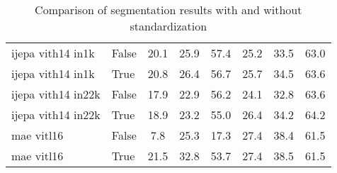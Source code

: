 \begin{table}
\begin{tabular}{llcccccc}
ijepa vith14 in1k & False & {\cellcolor[HTML]{FFF6B0}} \color[HTML]{000000} 20.1 & {\cellcolor[HTML]{E75337}} \color[HTML]{F1F1F1} 25.9 & {\cellcolor[HTML]{48AE5C}} \color[HTML]{F1F1F1} 57.4 & {\cellcolor[HTML]{E5F49B}} \color[HTML]{000000} 25.2 & {\cellcolor[HTML]{FBA35C}} \color[HTML]{000000} 33.5 & {\cellcolor[HTML]{E44C34}} \color[HTML]{F1F1F1} 63.0 \\
ijepa vith14 in1k & True & {\cellcolor[HTML]{FFFEBE}} \color[HTML]{000000} 20.8 & {\cellcolor[HTML]{EF633F}} \color[HTML]{F1F1F1} 26.4 & {\cellcolor[HTML]{54B45F}} \color[HTML]{F1F1F1} 56.7 & {\cellcolor[HTML]{DFF293}} \color[HTML]{000000} 25.7 & {\cellcolor[HTML]{FDC171}} \color[HTML]{000000} 34.5 & {\cellcolor[HTML]{F26841}} \color[HTML]{F1F1F1} 63.6 \\
ijepa vith14 in22k & False & {\cellcolor[HTML]{FED884}} \color[HTML]{000000} 17.9 & {\cellcolor[HTML]{A50026}} \color[HTML]{F1F1F1} 22.9 & {\cellcolor[HTML]{5DB961}} \color[HTML]{F1F1F1} 56.2 & {\cellcolor[HTML]{F2FAAE}} \color[HTML]{000000} 24.1 & {\cellcolor[HTML]{F88950}} \color[HTML]{F1F1F1} 32.8 & {\cellcolor[HTML]{F26841}} \color[HTML]{F1F1F1} 63.6 \\
ijepa vith14 in22k & True & {\cellcolor[HTML]{FEE999}} \color[HTML]{000000} 18.9 & {\cellcolor[HTML]{AD0826}} \color[HTML]{F1F1F1} 23.2 & {\cellcolor[HTML]{6EC064}} \color[HTML]{000000} 55.0 & {\cellcolor[HTML]{D7EE8A}} \color[HTML]{000000} 26.4 & {\cellcolor[HTML]{FDB768}} \color[HTML]{000000} 34.2 & {\cellcolor[HTML]{F88950}} \color[HTML]{F1F1F1} 64.2 \\
mae vitl16 & False & {\cellcolor[HTML]{A50026}} \color[HTML]{F1F1F1} 7.8 & {\cellcolor[HTML]{DE402E}} \color[HTML]{F1F1F1} 25.3 & {\cellcolor[HTML]{A50026}} \color[HTML]{F1F1F1} 17.3 & {\cellcolor[HTML]{C7E77F}} \color[HTML]{000000} 27.4 & {\cellcolor[HTML]{EEF8A8}} \color[HTML]{000000} 38.4 & {\cellcolor[HTML]{AF0926}} \color[HTML]{F1F1F1} 61.5 \\
mae vitl16 & True & {\cellcolor[HTML]{F7FCB4}} \color[HTML]{000000} 21.5 & {\cellcolor[HTML]{F8FCB6}} \color[HTML]{000000} 32.8 & {\cellcolor[HTML]{7FC866}} \color[HTML]{000000} 53.7 & {\cellcolor[HTML]{C7E77F}} \color[HTML]{000000} 27.4 & {\cellcolor[HTML]{EBF7A3}} \color[HTML]{000000} 38.5 & {\cellcolor[HTML]{AD0826}} \color[HTML]{F1F1F1} 61.5 \\
\bottomrule
\end{tabular}
\caption{Comparison of segmentation results with and without standardization}
\label{tab:standardization}
\end{table}
